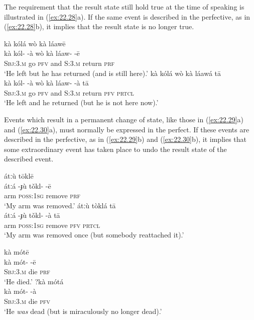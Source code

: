 The requirement that the result state still hold true at the time of speaking is illustrated in (\ref{ex:22.28}a). If the same event is described in the perfective, as in (\ref{ex:22.28}b), it implies that the result state is no longer true.


\ea \label{ex:22.28}
\ea  \glll kà  kólá  {}  wò  kà  láawē\\
kà  kól-  -à  wò  kà  láaw-  -ē\\
\textsc{Sbj:3.m}  go  \textsc{pfv}  and  \textsc{S:3.m}  return  \textsc{prf}\\
\glt ‘He left but he has returned (and is still here).’
\ex \glll   kà  kólá  {}  wò  kà  láawá  {}  tā\\
kà  kól-  -à  wò  kà  láaw-  -à  tā\\
\textsc{Sbj:3.m}  go  \textsc{pfv}  and  \textsc{S:3.m}  return  \textsc{pfv}  \textsc{prtcl}\\
\glt ‘He left and he returned (but he is not here now).’
\z \z


Events which result in a permanent change of state, like those in (\ref{ex:22.29}a) and (\ref{ex:22.30}a), must normally be expressed in the perfect. If these events are described in the perfective, as in (\ref{ex:22.29}b) and (\ref{ex:22.30}b), it implies that some extraordinary event has taken place to undo the result state of the described event.


\ea \label{ex:22.29}
\ea  \glll átːù  {}  tōklē\\
átːá  -ɟù  tǒkl-  -ē\\
arm  \textsc{poss:1sg}  remove  \textsc{prf}\\
\glt ‘My arm was removed.’
\ex \glll  átːù  {}  tòklá  {}  tā\\
átːá  -ɟù  tǒkl-  -à  tā\\
arm  \textsc{poss:1sg}  remove  \textsc{pfv}  \textsc{prtcl}\\
\glt ‘My arm was removed once (but somebody reattached it).’
\z \z

\ea \label{ex:22.30}
\ea  \glll kà  mótē\\
kà  mót-  -ē\\
\textsc{Sbj:3.m}  die  \textsc{prf}\\
\glt ‘He died.’
\ex \glll ?kà  mótá\\
 kà  mót-  -à\\
\textsc{Sbj:3.m}  die  \textsc{pfv}\\
\glt ‘He \textit{was} dead (but is miraculously no longer dead).’
\z \z


